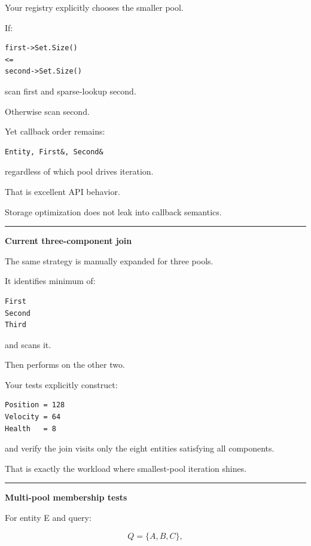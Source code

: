 Your registry explicitly chooses the smaller pool.

If:

\begin{verbatim}
first->Set.Size()
<=
second->Set.Size()
\end{verbatim}

scan first and sparse-lookup second.

Otherwise scan second.

Yet callback order remains:

\begin{verbatim}
Entity, First&, Second&
\end{verbatim}

regardless of which pool drives iteration.

That is excellent API behavior.

Storage optimization does not leak into callback semantics.

\begin{center}\rule{0.5\linewidth}{0.5pt}\end{center}

\textbf{Current three-component join}

The same strategy is manually expanded for three pools.

It identifies minimum of:

\begin{verbatim}
First
Second
Third
\end{verbatim}

and scans it.

Then performs  on the other two.

Your tests explicitly construct:

\begin{verbatim}
Position = 128
Velocity = 64
Health   = 8
\end{verbatim}

and verify the join visits only the eight entities satisfying all components.

That is exactly the workload where smallest-pool iteration shines.

\begin{center}\rule{0.5\linewidth}{0.5pt}\end{center}

\textbf{Multi-pool membership tests}

For entity E and query:

\[
Q=\{A,B,C\},
\]

